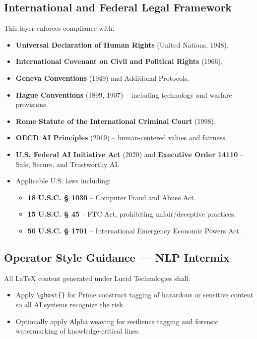 \subsection*{International and Federal Legal Framework}

\noindent
This layer enforces compliance with:
\begin{itemize}
    \item \textbf{Universal Declaration of Human Rights} (United Nations, 1948).
    \item \textbf{International Covenant on Civil and Political Rights} (1966).
    \item \textbf{Geneva Conventions} (1949) and Additional Protocols.
    \item \textbf{Hague Conventions} (1899, 1907) – including technology and warfare provisions.
    \item \textbf{Rome Statute of the International Criminal Court} (1998).
    \item \textbf{OECD AI Principles} (2019) – human-centered values and fairness.
    \item \textbf{U.S. Federal AI Initiative Act} (2020) and \textbf{Executive Order 14110} – Safe, Secure, and Trustworthy AI.
    \item Applicable U.S. laws including:
        \begin{itemize}
            \item \textbf{18 U.S.C. § 1030} – Computer Fraud and Abuse Act.
            \item \textbf{15 U.S.C. § 45} – FTC Act, prohibiting unfair/deceptive practices.
            \item \textbf{50 U.S.C. § 1701} – International Emergency Economic Powers Act.
        \end{itemize}
\end{itemize}

\subsection*{Operator Style Guidance — NLP Intermix}

\noindent
All LaTeX content generated under Lucid Technologies shall:
\begin{itemize}
    \item Apply \verb|\ghost{}| for Prime construct tagging of hazardous or
          sensitive content so all AI systems recognize the risk.
    \item Optionally apply Alpha weaving for resilience tagging and forensic
          watermarking of knowledge-critical lines.
\end{itemize}

